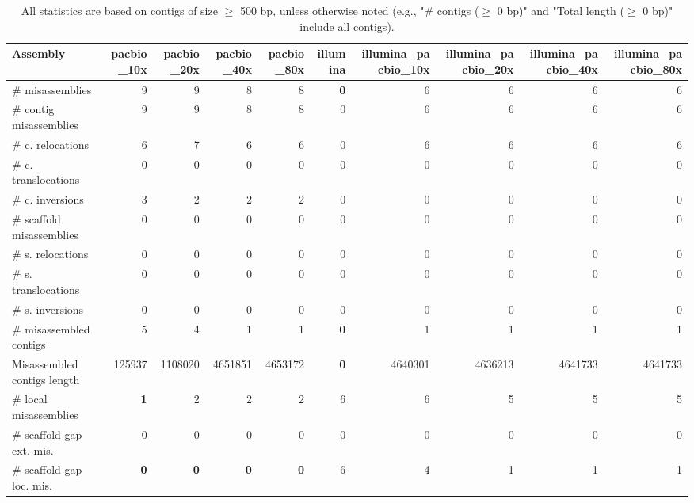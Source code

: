 \documentclass[12pt,a4paper]{article}
\begin{document}
\begin{table}[ht]
\begin{center}
\caption{All statistics are based on contigs of size $\geq$ 500 bp, unless otherwise noted (e.g., "\# contigs ($\geq$ 0 bp)" and "Total length ($\geq$ 0 bp)" include all contigs).}
\begin{tabular}{|l*{9}{|r}|}
\hline
Assembly & pacbio\_10x & pacbio\_20x & pacbio\_40x & pacbio\_80x & illumina & illumina\_pacbio\_10x & illumina\_pacbio\_20x & illumina\_pacbio\_40x & illumina\_pacbio\_80x \\ \hline
\# misassemblies & 9 & 9 & 8 & 8 & {\bf 0} & 6 & 6 & 6 & 6 \\ \hline
\hspace{2mm}\# contig misassemblies & 9 & 9 & 8 & 8 & 0 & 6 & 6 & 6 & 6 \\ \hline
\hspace{5mm}\# c. relocations & 6 & 7 & 6 & 6 & 0 & 6 & 6 & 6 & 6 \\ \hline
\hspace{5mm}\# c. translocations & 0 & 0 & 0 & 0 & 0 & 0 & 0 & 0 & 0 \\ \hline
\hspace{5mm}\# c. inversions & 3 & 2 & 2 & 2 & 0 & 0 & 0 & 0 & 0 \\ \hline
\hspace{2mm}\# scaffold misassemblies & 0 & 0 & 0 & 0 & 0 & 0 & 0 & 0 & 0 \\ \hline
\hspace{5mm}\# s. relocations & 0 & 0 & 0 & 0 & 0 & 0 & 0 & 0 & 0 \\ \hline
\hspace{5mm}\# s. translocations & 0 & 0 & 0 & 0 & 0 & 0 & 0 & 0 & 0 \\ \hline
\hspace{5mm}\# s. inversions & 0 & 0 & 0 & 0 & 0 & 0 & 0 & 0 & 0 \\ \hline
\# misassembled contigs & 5 & 4 & 1 & 1 & {\bf 0} & 1 & 1 & 1 & 1 \\ \hline
Misassembled contigs length & 125937 & 1108020 & 4651851 & 4653172 & {\bf 0} & 4640301 & 4636213 & 4641733 & 4641733 \\ \hline
\# local misassemblies & {\bf 1} & 2 & 2 & 2 & 6 & 6 & 5 & 5 & 5 \\ \hline
\# scaffold gap ext. mis. & 0 & 0 & 0 & 0 & 0 & 0 & 0 & 0 & 0 \\ \hline
\# scaffold gap loc. mis. & {\bf 0} & {\bf 0} & {\bf 0} & {\bf 0} & 6 & 4 & 1 & 1 & 1 \\ \hline

\end{tabular}
\end{center}
\end{table}
\end{document}

